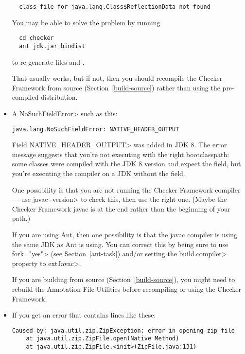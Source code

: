 \begin{itemize}
\begin{Verbatim}
  class file for java.lang.Class$ReflectionData not found
\end{Verbatim}

You may be able to solve the problem by running

\begin{Verbatim}
  cd checker
  ant jdk.jar bindist
\end{Verbatim}

\noindent
to re-generate files  and .

That usually works, but if not, then you should recompile the Checker
Framework from source (Section~\ref{build-source}) rather than using
the pre-compiled distribution.


\item
A \<NoSuchFieldError> such as this:

\begin{Verbatim}
java.lang.NoSuchFieldError: NATIVE_HEADER_OUTPUT
\end{Verbatim}

\noindent
Field \<NATIVE\_HEADER\_OUTPUT> was added in JDK 8.
The error message suggests that
you're not executing with the right bootclasspath: some classes were
compiled with the JDK 8 version and expect the field, but you're
executing the compiler on a JDK without the field.

One possibility is that you are not running the Checker Framework compiler
--- use \<javac -version> to check this, then use the right one.  (Maybe
the Checker Framework javac is at the end rather than the beginning of your
path.)

If you are using Ant, then one possibility
is that the javac compiler is using the same JDK as Ant is using.  You can
correct this by being sure to use \<fork="yes"> (see
Section~\ref{ant-task}) and/or setting the \<build.compiler> property to
\<extJavac>.

If you are building from source (Section~\ref{build-source}),
you might need to rebuild the Annotation
File Utilities before recompiling or using the Checker Framework.


\item
If you get an error that contains lines like these:

\begin{Verbatim}
Caused by: java.util.zip.ZipException: error in opening zip file
    at java.util.zip.ZipFile.open(Native Method)
    at java.util.zip.ZipFile.<init>(ZipFile.java:131)
\end{Verbatim}


\end{itemize}
